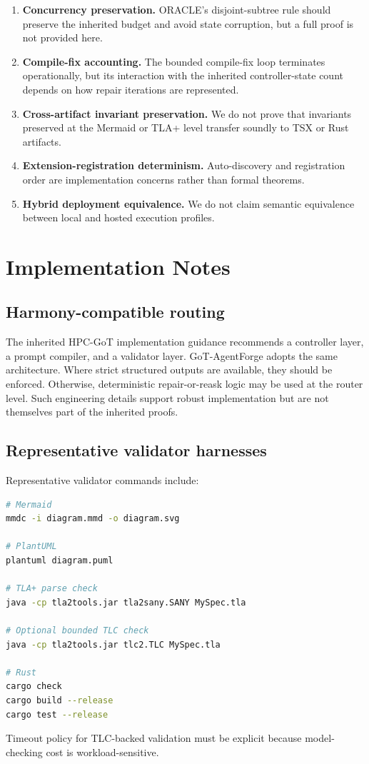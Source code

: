 \documentclass[11pt,a4paper,oneside]{article}
\begin{document}
\begin{enumerate}[leftmargin=2em]
    \item \textbf{Concurrency preservation.} ORACLE's disjoint-subtree rule should preserve the inherited budget and avoid state corruption, but a full proof is not provided here.
    \item \textbf{Compile-fix accounting.} The bounded compile-fix loop terminates operationally, but its interaction with the inherited controller-state count depends on how repair iterations are represented.
    \item \textbf{Cross-artifact invariant preservation.} We do not prove that invariants preserved at the Mermaid or TLA+ level transfer soundly to TSX or Rust artifacts.
    \item \textbf{Extension-registration determinism.} Auto-discovery and registration order are implementation concerns rather than formal theorems.
    \item \textbf{Hybrid deployment equivalence.} We do not claim semantic equivalence between local and hosted execution profiles.
\end{enumerate}

\section{Implementation Notes}
\subsection{Harmony-compatible routing}
The inherited HPC-GoT implementation guidance recommends a controller layer, a prompt compiler, and a validator layer. GoT-AgentForge adopts the same architecture. Where strict structured outputs are available, they should be enforced. Otherwise, deterministic repair-or-reask logic may be used at the router level. Such engineering details support robust implementation but are not themselves part of the inherited proofs.

\subsection{Representative validator harnesses}
Representative validator commands include:
\begin{lstlisting}[language=bash,caption={Representative validator commands.}]
# Mermaid
mmdc -i diagram.mmd -o diagram.svg

# PlantUML
plantuml diagram.puml

# TLA+ parse check
java -cp tla2tools.jar tla2sany.SANY MySpec.tla

# Optional bounded TLC check
java -cp tla2tools.jar tlc2.TLC MySpec.tla

# Rust
cargo check
cargo build --release
cargo test --release
\end{lstlisting}
Timeout policy for TLC-backed validation must be explicit because model-checking cost is workload-sensitive.
\end{document}
